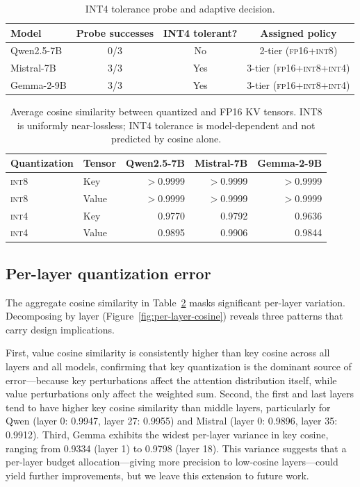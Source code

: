 \documentclass[11pt]{article}
\newcommand{\fp}{\textsc{fp16}}
\newcommand{\intviii}{\textsc{int8}}
\newcommand{\intiv}{\textsc{int4}}
\theoremstyle{plain}
\theoremstyle{definition}
\begin{document}
\begin{table}[t]
\centering
\caption{INT4 tolerance probe and adaptive decision.}
\label{tab:probe}
\small
\begin{tabular}{lccc}
\toprule
Model & Probe successes & INT4 tolerant? & Assigned policy \\
\midrule
Qwen2.5-7B & 0/3 & No & 2-tier (\fp{}+\intviii{}) \\
Mistral-7B & 3/3 & Yes & 3-tier (\fp{}+\intviii{}+\intiv{}) \\
Gemma-2-9B & 3/3 & Yes & 3-tier (\fp{}+\intviii{}+\intiv{}) \\
\bottomrule
\end{tabular}
\end{table}

\begin{table}[t]
\centering
\caption{Average cosine similarity between quantized and FP16 KV tensors.  INT8 is uniformly near-lossless; INT4 tolerance is model-dependent and not predicted by cosine alone.}
\label{tab:cosine}
\small
\begin{tabular}{llrrr}
\toprule
Quantization & Tensor & Qwen2.5-7B & Mistral-7B & Gemma-2-9B \\
\midrule
\intviii{} & Key & $>$0.9999 & $>$0.9999 & $>$0.9999 \\
\intviii{} & Value & $>$0.9999 & $>$0.9999 & $>$0.9999 \\
\intiv{} & Key & 0.9770 & 0.9792 & 0.9636 \\
\intiv{} & Value & 0.9895 & 0.9906 & 0.9844 \\
\bottomrule
\end{tabular}
\end{table}

\subsection{Per-layer quantization error}
\label{sec:per-layer-quant}

The aggregate cosine similarity in Table~\ref{tab:cosine} masks significant per-layer variation.  Decomposing by layer (Figure~\ref{fig:per-layer-cosine}) reveals three patterns that carry design implications.

First, value cosine similarity is consistently higher than key cosine across all layers and all models, confirming that key quantization is the dominant source of error---because key perturbations affect the attention distribution itself, while value perturbations only affect the weighted sum.  Second, the first and last layers tend to have higher key cosine similarity than middle layers, particularly for Qwen (layer 0: 0.9947, layer 27: 0.9955) and Mistral (layer 0: 0.9896, layer 35: 0.9912).  Third, Gemma exhibits the widest per-layer variance in key cosine, ranging from 0.9334 (layer 1) to 0.9798 (layer 18).  This variance suggests that a per-layer budget allocation---giving more precision to low-cosine layers---could yield further improvements, but we leave this extension to future work.
\end{document}
